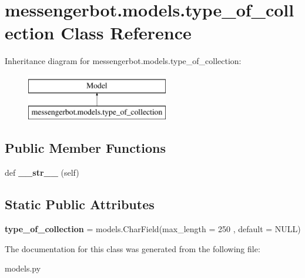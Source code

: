 \hypertarget{classmessengerbot_1_1models_1_1type__of__collection}{}\section{messengerbot.\+models.\+type\+\_\+of\+\_\+collection Class Reference}
\label{classmessengerbot_1_1models_1_1type__of__collection}
Inheritance diagram for messengerbot.\+models.\+type\+\_\+of\+\_\+collection\+:\begin{figure}[H]
\begin{center}
\leavevmode
\includegraphics[height=2.000000cm]{classmessengerbot_1_1models_1_1type__of__collection}
\end{center}
\end{figure}
\subsection*{Public Member Functions}
\begin{DoxyCompactItemize}
\item 
\mbox{\label{classmessengerbot_1_1models_1_1type__of__collection_a1b6a6ac597b4c84bfd6a96bfaedfc708}} 
def {\bfseries \+\_\+\+\_\+str\+\_\+\+\_\+} (self)
\end{DoxyCompactItemize}
\subsection*{Static Public Attributes}
\begin{DoxyCompactItemize}
\item 
\mbox{\label{classmessengerbot_1_1models_1_1type__of__collection_a2d65815b76f23bad35232b6c926aed23}} 
{\bfseries type\+\_\+of\+\_\+collection} = models.\+Char\+Field(max\+\_\+length = 250 , default = \textquotesingle{}N\+U\+LL\textquotesingle{})
\end{DoxyCompactItemize}


The documentation for this class was generated from the following file\+:\begin{DoxyCompactItemize}
\item 
models.\+py\end{DoxyCompactItemize}
